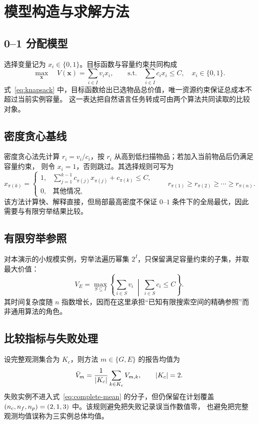 \section{模型构造与求解方法}

\subsection{0--1 分配模型}

选择变量记为 $x_i\in\{0,1\}$。目标函数与容量约束共同构成
\begin{equation}
  \max_{\boldsymbol{x}}\quad V(\boldsymbol{x})=\sum_{i\in I}v_i x_i,
  \qquad
  \text{s.t.}\quad \sum_{i\in I}c_i x_i\leq C,
  \quad x_i\in\{0,1\}.
  \label{eq:knapsack}
\end{equation}
式~\eqref{eq:knapsack} 中，目标函数给出已选物品总价值，唯一资源约束保证总成本不超过当前实例容量。
这一表达把自然语言任务转成可由两个算法共同读取的比较对象。

\subsection{密度贪心基线}

密度贪心法先计算 $r_i=v_i/c_i$，按 $r_i$ 从高到低扫描物品；若加入当前物品后仍满足容量约束，
则令 $x_i=1$，否则跳过。其选择规则可写为
\begin{equation}
  x_{\pi(k)}=
  \begin{cases}
    1, & \displaystyle \sum_{j=1}^{k-1}c_{\pi(j)}x_{\pi(j)}+c_{\pi(k)}\leq C,\\[4pt]
    0, & \text{其他情况},
  \end{cases}
  \qquad
  r_{\pi(1)}\geq r_{\pi(2)}\geq\cdots\geq r_{\pi(n)}.
  \label{eq:greedy}
\end{equation}
该方法计算快、解释直接，但局部最高密度不保证 $0$--$1$ 条件下的全局最优，因此需要与有限穷举结果比较。

\subsection{有限穷举参照}

对本演示的小规模实例，穷举法遍历幂集 $2^I$，只保留满足容量约束的子集，并取最大价值：
\begin{equation}
  V_E=\max_{S\subseteq I}
  \left\{
    \sum_{i\in S}v_i
    \;\middle|\;
    \sum_{i\in S}c_i\leq C
  \right\}.
  \label{eq:exhaustive}
\end{equation}
其时间复杂度随 $n$ 指数增长，因而在这里承担“已知有限搜索空间的精确参照”而非通用算法的角色。

\subsection{比较指标与失败处理}

设完整观测集合为 $K_c$，则方法 $m\in\{G,E\}$ 的报告均值为
\begin{equation}
  \bar V_m=\frac{1}{|K_c|}\sum_{k\in K_c}V_{m,k},
  \qquad |K_c|=2.
  \label{eq:complete-mean}
\end{equation}
失败实例不进入式~\eqref{eq:complete-mean} 的分子，但仍保留在计划覆盖
$(n_c,n_f,n_p)=(2,1,3)$ 中。该规则避免把失败记录误当作数值零，
也避免把完整观测均值误称为三实例总体均值。
